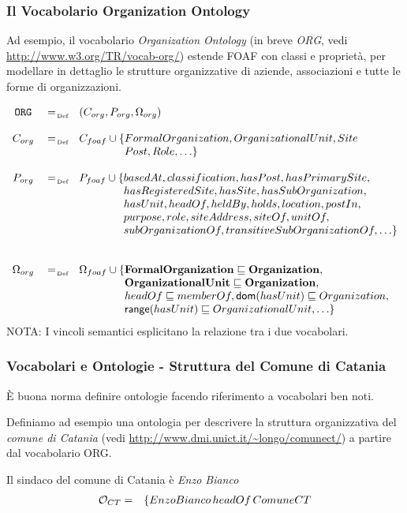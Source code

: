 \documentclass[8pt]{beamer}
\begin{document}
\begin{frame}
\frametitle{Il Vocabolario Organization Ontology}
Ad esempio, il vocabolario \emph{Organization Ontology} (in breve \emph{ORG}, vedi \url{http://www.w3.org/TR/vocab-org/})
estende FOAF con classi e propriet\`a, per modellare in dettaglio 
le strutture organizzative di aziende, associazioni e tutte le forme 
di organizzazioni.

\[
 \begin{array}{ccl}
 \org & \defAs & (C_{org}, P_{org}, \Omega_{org}) \\
 &&\\
 C_{org} & \defAs & C_{foaf} \cup \{FormalOrganization, OrganizationalUnit,  Site \\
 && \phantom{C_{foaf} \cup \{}Post, Role, \ldots \}\\
 &&\\
 P_{org} & \defAs & P_{foaf} \cup \{ basedAt, classification, hasPost, hasPrimarySite, \\
 &&\phantom{P_{foaf} \cup \{}hasRegisteredSite, hasSite, hasSubOrganization, \\
 &&\phantom{P_{foaf} \cup \{}hasUnit, headOf, heldBy, holds, location, postIn,\\
 &&\phantom{P_{foaf} \cup \{}purpose, role, siteAddress, siteOf, unitOf, \\ 
 &&\phantom{P_{foaf} \cup \{}subOrganizationOf,  transitiveSubOrganizationOf, \ldots \}\\ 
 &&\phantom{P_{foaf} \cup \{}  \\
 &&\\
 \Omega_{org} & \defAs & \Omega_{foaf} \cup \{ \mathbf{FormalOrganization \Issub Organization,} \\
 &&\phantom{\Omega_{foaf} \cup \{}\mathbf{OrganizationalUnit \Issub Organization,}\\
 &&\phantom{\Omega_{foaf} \cup \{}headOf \Issub memberOf, \dom(hasUnit)\Issub Organization, \\ 
 &&\phantom{\Omega_{foaf} \cup \{}\range(hasUnit) \Issub OrganizationalUnit, \ldots \}
 \end{array}
\]
NOTA: I vincoli semantici esplicitano la relazione tra i due vocabolari.
\end{frame}

\begin{frame}
\frametitle{Vocabolari e Ontologie - Struttura del Comune di Catania}
\`E buona norma definire ontologie facendo riferimento a vocabolari
ben noti.
\vspace{\baselineskip}

Definiamo ad esempio una ontologia per descrivere la struttura
organizzativa del \emph{comune di Catania} (vedi \url{http://www.dmi.unict.it/~longo/comunect/})
a partire dal vocabolario ORG.
\vspace{\baselineskip}

Il sindaco del comune di Catania è \emph{Enzo Bianco}
\[
\begin{array}{rl}
\mathcal{O}_{CT} = & \{ EnzoBianco\,headOf\,ComuneCT \\
\end{array} 
\]
\end{frame}
\end{document}
